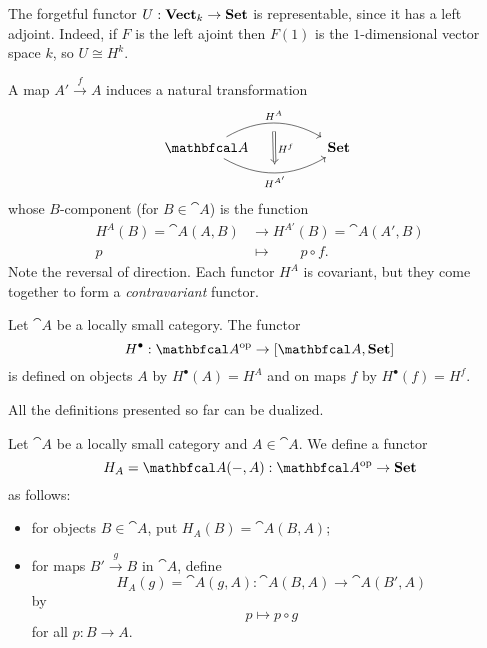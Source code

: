 \begin{example}
    The forgetful functor $U:\mathbf{Vect}_k\to\mathbf{Set}$ is representable, since it has a left adjoint. Indeed, if $F$ is the left ajoint then $F(1)$ is the $1$-dimensional vector space $k$, so $U\cong H^k$.
\end{example}

A map $A'\xrightarrow{f}A$ induces a natural transformation
\begin{equation*}
\begin{tikzcd}
    \cat{A}
    \arrow[rr, bend left=30, "H^A"{name=t}]
    \arrow[rr, bend right=30, "H^{A'}"'{name=b}]
    && \bcat{Set} \
    \arrow[from=t, Rightarrow, to=b, "H^f", shorten <= 6pt, shorten >= 6pt]
\end{tikzcd}
\end{equation*}
whose $B$-component (for $B\in\cat{A}$) is the function
\begin{align*}
    H^A(B)=\cat{A}(A,B) &\to H^{A'}(B)=\cat{A}(A',B)\\
    p\qquad &\mapsto \qquad p\circ f.
\end{align*}
Note the reversal of direction. Each functor $H^A$ is covariant, but they come together to form a \textit{contravariant} functor.

\begin{definition}
    Let $\cat{A}$ be a locally small category. The functor
    \begin{equation*}
        H^{\bullet}: \catop{A}\to[\cat{A}, \bcat{Set}]
    \end{equation*}
    is defined on objects $A$ by $H^{\bullet}(A)=H^A$ and on maps $f$ by $H^{\bullet}(f)=H^f$.
\end{definition}

All the definitions presented so far can be dualized.

\begin{definition}
    Let $\cat{A}$ be a locally small category and $A\in\cat{A}$. We define a functor
    \begin{equation*}
        H_A=\cat{A}(-,A): \catop{A}\to\bcat{Set}
    \end{equation*}
    as follows:
    \begin{itemize}
        \item for objects $B\in\cat{A}$, put $H_A(B)=\cat{A}(B,A)$;
        \item for maps $B'\xrightarrow{g}B$ in $\cat{A}$, define
            \begin{equation*}
                H_A(g)=\cat{A}(g,A): \cat{A}(B,A)\to\cat{A}(B',A)
            \end{equation*}
            by
            \begin{equation*}
                p\mapsto p\circ g
            \end{equation*}
            for all $p:B\to A$.
    \end{itemize}
\end{definition}


